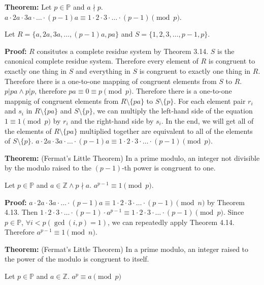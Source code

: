 \item \textbf{Theorem:} Let \(p \in \mathbb P\) and \(a \nmid p\). \(a \cdot 2a \cdot 3a \cdot \dots \cdot (p-1)a \equiv 1 \cdot 2 \cdot 3 \cdot \dots \cdot (p-1) \pmod p\).

Let \(R = \{a, 2a, 3a, \dots, (p-1)a, pa\}\) and \(S = \{1, 2, 3, \dots, p-1, p\}\).

\textbf{Proof:} \(R\) consitutes a complete residue system by Theorem 3.14. \(S\) is the canonical complete residue system. Therefore every element of \(R\) is congruent to exactly one thing in \(S\) and everything in \(S\) is congruent to exactly one thing in \(R\). Therefore there is a one-to-one mapping of congruent elements from \(S\) to \(R\). \(p|pa \wedge p|p\), therefore \(pa \equiv 0 \equiv p \pmod p\). Therefore there is a one-to-one mappnig of congruent elements from \(R \setminus \{pa\}\) to \(S \setminus \{p\}\). For each element pair \(r_i\) and \(s_i\) in \(R \setminus \{pa\}\) and \(S \setminus \{p\}\), we can multiply the left-hand side of the equation \(1 \equiv 1 \pmod p\) by \(r_i\) and the right-hand side by \(s_i\). In the end, we will get all of the elements of \(R \setminus \{pa\}\) multiplied together are equivalent to all of the elements of \(S \setminus \{p\}\). \(a \cdot 2a \cdot 3a \cdot \dots \cdot (p-1)a \equiv 1 \cdot 2 \cdot 3 \cdot \dots \cdot (p-1) \pmod p\). \qedhere

\item \textbf{Theorem:} (Fermat's Little Theorem) In a prime modulo, an integer not divisible by the modulo raised to the \((p-1)\)-th power is congruent to one.

Let \(p \in \mathbb P\) and \(a \in \mathbb Z \wedge p \nmid a\). \(a^{p-1} \equiv 1 \pmod p\).

\textbf{Proof:} \(a \cdot 2a \cdot 3a \cdot \dots \cdot (p-1)a \equiv 1 \cdot 2 \cdot 3 \cdot \dots \cdot (p-1) \pmod n\) by Theorem 4.13. Then \(1 \cdot 2 \cdot 3 \cdot \dots \cdot (p-1) \cdot a^{p-1} \equiv 1 \cdot 2 \cdot 3 \cdot \dots \cdot (p-1) \pmod p\). Since \(p \in \mathbb P\), \(\forall i < p (\gcd(i, p) = 1)\), we can repeatedly apply Theorem 4.14. Therefore \(a^{p-1} \equiv 1 \pmod n\). \qedhere

\item \textbf{Theorem:} (Fermat's Little Theorem) In a prime modulo, an integer raised to the power of the modulo is congruent to itself.

Let \(p \in \mathbb P\) and \(a \in \mathbb Z\). \(a^p \equiv a \pmod p\)

